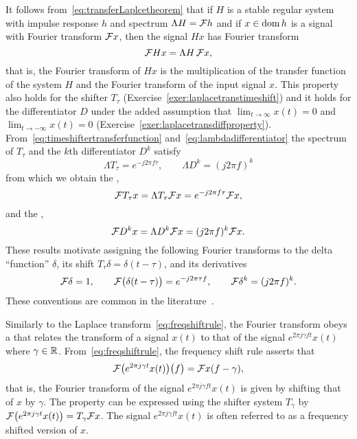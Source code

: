 It follows from~\eqref{eq:transferLaplcetheorem} that if $H$ is a stable regular system with impulse response $h$ and spectrum $\Lambda H = {\mathcal F} h$ and if $x \in \operatorname{dom} h$ is a signal with Fourier transform ${\mathcal F} x$, then the signal $H x$ has Fourier transform
\[
{\mathcal F} H x = \Lambda H \, {\mathcal F} x,
\]
that is, the Fourier transform of $Hx$ is the multiplication of the transfer function of the system $H$ and the Fourier transform of the input signal $x$.  This property also holds for the shifter $T_\tau$ (Exercise~\ref{exer:laplacetranstimeshift}) and it holds for the differentiator $D$ under the added assumption that $\lim_{t \to \infty}x(t) = 0$ and $\lim_{t \to -\infty} x(t) = 0$ (Exercise~\ref{exer:laplacetransdiffproperty}).  From~\eqref{eq:timeshiftertransferfunction} and~\eqref{eq:lambdadifferentiator} the spectrum of $T_\tau$ and the $k$th differentiator $D^k$ satisfy 
\[
\Lambda T_\tau = e^{-j2\pi f \tau}, \qquad \Lambda D^k = (j2\pi f)^k
\]
from which we obtain the ,
 \[
 {\mathcal F} T_\tau x = \Lambda T_\tau {\mathcal F} x = e^{-j2\pi f \tau} {\mathcal F} x,
\]
and the ,
\[
 {\mathcal F} D^k x = \Lambda D^k {\mathcal F} x =  (j2\pi f)^k {\mathcal F} x.
\]
These results motivate assigning the following Fourier transforms to the delta ``function'' $\delta$, its shift $T_\tau \delta = \delta(t - \tau)$, and its derivatives
\begin{equation}\label{eqftsofdeltas}
{\mathcal F} \delta = 1, \qquad {\mathcal F}\big(\delta(t - \tau)\big) = e^{-j2\pi\tau f}, \qquad {\mathcal F} \delta^k = (j2\pi f)^k.
\end{equation}
These conventions are common in the literature~\citep{Oppenheiim_sigs_sys_1996}.

Similarly to the Laplace transform~\eqref{eq:freqshiftrule}, the Fourier transform obeys a  that relates the transform of a signal $x(t)$ to that of the signal $e^{2\pi j \gamma f t} x(t)$ where $\gamma \in {\mathbb R}$.  From~\eqref{eq:freqshiftrule}, the frequency shift rule asserts that
\begin{align}
{\mathcal F}\big( e^{2\pi j \gamma t} x(t) \big)\big( f\big) =  {\mathcal F} x(f - \gamma), \label{eq:freqshiftrulefourier}
\end{align}
that is, the Fourier transform of the signal $e^{2\pi j \gamma f t} x(t)$ is given by shifting that of $x$ by $\gamma$.  The property can be expressed using the shifter system $T_\gamma$ by ${\mathcal F} \big( e^{2\pi j \gamma t} x(t) \big) = T_\gamma {\mathcal F} x$.  The signal $e^{2\pi j \gamma f t} x(t)$ is often referred to as a frequency shifted version of $x$.
 
